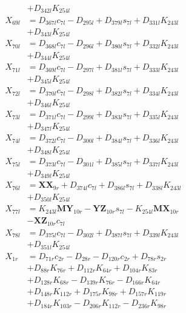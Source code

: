 \begin{multicols}{2}
\begin{align}
&+ D_{342l}K_{254l} \nonumber \\
X_{69l} &= D_{367l}c_{7l} - D_{295l} + D_{379l}s_{7l} + D_{331l}K_{243l}  \nonumber \\
&+ D_{343l}K_{254l} \nonumber \\
X_{70l} &= D_{368l}c_{7l} - D_{296l} + D_{380l}s_{7l} + D_{332l}K_{243l}  \nonumber \\
&+ D_{344l}K_{254l} \nonumber \\
X_{71l} &= D_{369l}c_{7l} - D_{297l} + D_{381l}s_{7l} + D_{333l}K_{243l}  \nonumber \\
&+ D_{345l}K_{254l} \nonumber \\
X_{72l} &= D_{370l}c_{7l} - D_{298l} + D_{382l}s_{7l} + D_{334l}K_{243l}  \nonumber \\
&+ D_{346l}K_{254l} \nonumber \\
X_{73l} &= D_{371l}c_{7l} - D_{299l} + D_{383l}s_{7l} + D_{335l}K_{243l}  \nonumber \\
&+ D_{347l}K_{254l} \nonumber \\
X_{74l} &= D_{372l}c_{7l} - D_{300l} + D_{384l}s_{7l} + D_{336l}K_{243l}  \nonumber \\
&+ D_{348l}K_{254l} \nonumber \\
X_{75l} &= D_{373l}c_{7l} - D_{301l} + D_{385l}s_{7l} + D_{337l}K_{243l}  \nonumber \\
&+ D_{349l}K_{254l} \nonumber \\
X_{76l} &= \mathbf{XX}_{9r} + D_{374l}c_{7l} + D_{386l}s_{7l} + D_{338l}K_{243l}  \nonumber \\
&+ D_{350l}K_{254l} \nonumber \\
X_{77l} &= K_{243l}\mathbf{MY}_{10r} - \mathbf{YZ}_{10r}s_{7l} - K_{254l}\mathbf{MX}_{10r}  \nonumber \\
&- \mathbf{XZ}_{10r}c_{7l} \nonumber \\
X_{78l} &= D_{375l}c_{7l} - D_{302l} + D_{387l}s_{7l} + D_{339l}K_{243l}  \nonumber \\
&+ D_{351l}K_{254l} \nonumber \\
X_{1r} &= D_{71r}c_{2r} - D_{28r} - D_{120r}c_{2r} + D_{78r}s_{2r}  \nonumber \\
&+ D_{88r}K_{76r} + D_{112r}K_{64r} + D_{104r}K_{83r}  \nonumber \\
&+ D_{128r}K_{68r} - D_{139r}K_{76r} - D_{166r}K_{64r}  \nonumber \\
&+ D_{148r}K_{112r} + D_{175r}K_{98r} + D_{157r}K_{119r}  \nonumber \\
&+ D_{184r}K_{103r} - D_{206r}K_{112r} - D_{236r}K_{98r}  \nonumber \\

\end{align}
\end{multicols}
